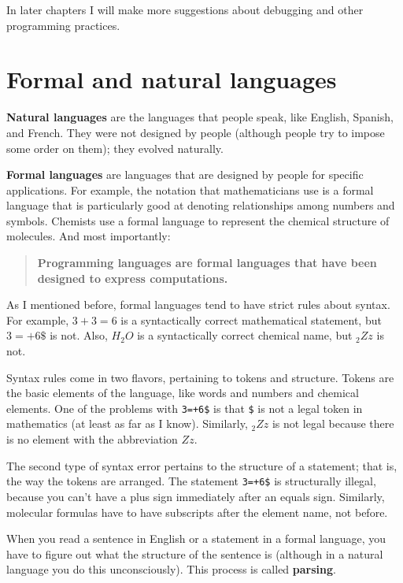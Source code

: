 
In later chapters I will make more suggestions about debugging
and other programming practices.

\section{Formal and natural languages}
\label{formal}

{\bf Natural languages} are the languages that people speak,
like English, Spanish, and French.  They were not designed
by people (although people try to impose some order on them);
they evolved naturally.

{\bf Formal languages} are languages that are designed by people for
specific applications.  For example, the notation that mathematicians
use is a formal language that is particularly good at denoting
relationships among numbers and symbols.  Chemists use a formal
language to represent the chemical structure of molecules.  And
most importantly:

\begin{quote}
{\bf Programming languages are formal languages that have been
designed to express computations.}
\end{quote}

As I mentioned before, formal languages tend to have strict rules
about syntax.  For example, $3+3=6$ is a syntactically correct
mathematical statement, but $3=+6\$$ is not.  Also, $H_2O$ is a
syntactically correct chemical name, but $_2Zz$ is not.

Syntax rules come in two flavors, pertaining to tokens and structure.
Tokens are the basic elements of the language, like words and numbers
and chemical elements.  One of the problems with {\tt 3=+6\$} is that
{\tt \$} is not a legal token in mathematics (at least as far as I
know).  Similarly, $_2Zz$ is not legal because there is no element with
the abbreviation $Zz$.

The second type of syntax error pertains to the structure of a
statement; that is, the way the tokens are arranged.  The statement
{\tt 3=+6\$} is structurally illegal, because you can't have a plus
sign immediately after an equals sign.  Similarly, molecular formulas
have to have subscripts after the element name, not before.

When you read a sentence in English or a statement in a formal
language, you have to figure out what the structure of the sentence is
(although in a natural language you do this unconsciously).  This
process is called {\bf parsing}.

